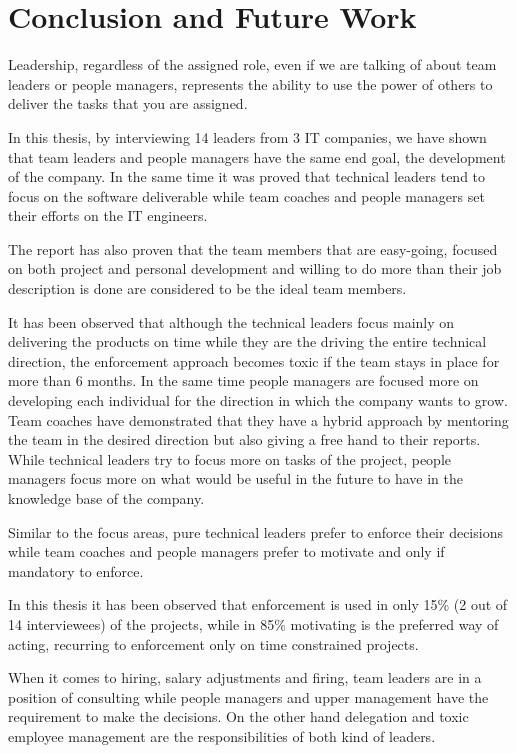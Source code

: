 \chapter{Conclusion and Future Work}
\label{sec:con-fut}

Leadership, regardless of the assigned role, even if we are talking of about team leaders or people managers, represents the ability to use the power of others to deliver the tasks that you are assigned. 

In this thesis, by interviewing 14 leaders from 3 IT companies, we have shown that team leaders and people managers have the same end goal, the development of the company. In the same time it was proved that technical leaders tend to focus on the software deliverable while team coaches and people managers set their efforts on the IT engineers.

The report has also proven that the team members that are easy-going, focused on both project and personal development and willing to do more than their job description is done are considered to be the ideal team members.

It has been observed that although the technical leaders focus mainly on delivering the products on time while they are the driving the entire technical direction, the enforcement approach becomes toxic if the team stays in place for more than 6 months. In the same time people managers are focused more on developing each individual for the direction in which the company wants to grow. Team coaches have demonstrated that they have a hybrid approach by mentoring the team in the desired direction but also giving a free hand to their reports. While technical leaders try to focus more on tasks of the project, people managers focus more on what would be useful in the future to have in the knowledge base of the company.

Similar to the focus areas, pure technical leaders prefer to enforce their decisions while team coaches and people managers prefer to motivate and only if mandatory to enforce.

In this thesis it has been observed that enforcement is used in only 15\% (2 out of 14 interviewees) of the projects, while in 85\% motivating is the preferred way of acting, recurring to enforcement only on time constrained projects. 

When it comes to hiring, salary adjustments and firing, team leaders are in a position of consulting while people managers and upper management have the requirement to make the decisions. On the other hand delegation and toxic employee management are the responsibilities of both kind of leaders.

